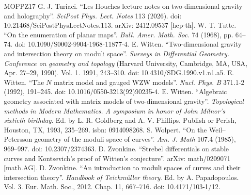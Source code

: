 \begin{thebibliography}{MOPPZ17}
 G. J. Turiaci. ``Les Houches lecture notes on two-dimensional gravity and holography''. \emph{SciPost Phys. Lect. Notes} 113 (2026). doi: 10.21468/SciPostPhysLectNotes.113. arXiv: 2412.09537 [hep-th].
 W. T. Tutte. ``On the enumeration of planar maps''. \emph{Bull. Amer. Math. Soc.} 74 (1968), pp. 64--74. doi: 10.1090/S0002-9904-1968-11877-4.
 E. Witten. ``Two-dimensional gravity and intersection theory on moduli space''. \emph{Surveys in Differential Geometry. Conference on geometry and topology} (Harvard University, Cambridge, MA, USA, Apr. 27--29, 1990). Vol. 1. 1991, 243--310. doi: 10.4310/SDG.1990.v1.n1.a5.
 E. Witten. ``The $N$ matrix model and gauged WZW models''. \emph{Nucl. Phys. B} 371.1-2 (1992), 191--245. doi: 10.1016/0550-3213(92)90235-4.
 E. Witten. ``Algebraic geometry associated with matrix models of two-dimensional gravity''. \emph{Topological methods in Modern Mathematics. A symposium in honor of John Milnor's sixtieth birthday}. Ed. by L. R. Goldberg and A. V. Phillips. Publish or Perish, Houston, TX, 1993, 235--269. isbn: 0914098268.
 S. Wolpert. ``On the Weil--Petersson geometry of the moduli space of curves''. \emph{Am. J. Math} 107.4 (1985), 969--997. doi: 10.2307/2374363.
 D. Zvonkine. ``Strebel differentials on stable curves and Kontsevich's proof of Witten's conjecture''. arXiv: math/0209071 [math.AG].
 D. Zvonkine. ``An introduction to moduli spaces of curves and their intersection theory''. \emph{Handbook of Teichm\"uller theory}. Ed. by A. Papadopoulos. Vol. 3. Eur. Math. Soc., 2012. Chap. 11, 667--716. doi: 10.4171/103-1/12.
\end{thebibliography}

\par\medskip
{}
\par{}
\par\medskip
{}
\par{}
